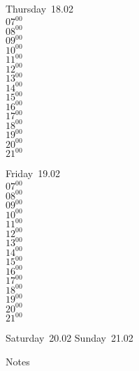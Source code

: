 \documentclass[11pt,a4paper]{book}\usepackage[]{graphicx}\usepackage[]{color}
\begin{document}
\clearpage
\begin{headerbox}
\end{headerbox}
\begin{weekdaybox}
  Thursday~18.02\\
  { 
  \vfill
  $07^{00}$\\
$08^{00}$\\
$09^{00}$\\
$10^{00}$\\
$11^{00}$\\
$12^{00}$\\
$13^{00}$\\
$14^{00}$\\
$15^{00}$\\
$16^{00}$\\
$17^{00}$\\
$18^{00}$\\
$19^{00}$\\
$20^{00}$\\
$21^{00}$\\
  }
\end{weekdaybox} 
\begin{weekdaybox}
  Friday~19.02\\
  { 
  \vfill
  $07^{00}$\\
$08^{00}$\\
$09^{00}$\\
$10^{00}$\\
$11^{00}$\\
$12^{00}$\\
$13^{00}$\\
$14^{00}$\\
$15^{00}$\\
$16^{00}$\\
$17^{00}$\\
$18^{00}$\\
$19^{00}$\\
$20^{00}$\\
$21^{00}$\\
  }
\end{weekdaybox}
\begin{weekendbox}
  Saturday~20.02
  \tcblower
  Sunday~21.02
\end{weekendbox} %
\begin{notebox}
  Notes
\end{notebox}
\clearpage
\end{document}

